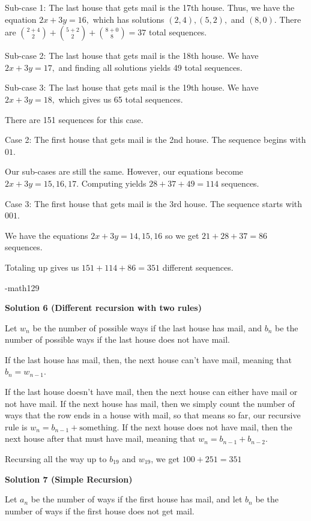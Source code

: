 \begin{enumerate}
 Sub-case 1: The last house that gets mail is the 17th house. Thus, we have the equation $2x+3y=16,$ which has solutions $(2,4),(5,2),$ and $(8,0).$ There are $\binom{2+4}{2}+\binom{5+2}{2}+\binom{8+0}{8}=37$ total sequences.

 Sub-case 2: The last house that gets mail is the 18th house. We have $2x+3y=17,$ and finding all solutions yields 49 total sequences.

 Sub-case 3: The last house that gets mail is the 19th house. We have $2x+3y=18,$ which gives us 65 total sequences.

 There are 151 sequences for this case.

 Case 2: The first house that gets mail is the 2nd house. The sequence begins with $01.$

 Our sub-cases are still the same. However, our equations become $2x+3y=15,16,17.$ Computing yields $28+37+49=114$ sequences.

 Case 3: The first house that gets mail is the 3rd house. The sequence starts with $001.$

 We have the equations $2x+3y=14,15,16$ so we get $21+28+37=86$ sequences.

 Totaling up gives us $151+114+86=351$ different sequences.

 -math129

 



\textbf{Solution 6 (Different recursion with two rules)}

Let $w_n$ be the number of possible ways if the last house has mail, and $b_n$ be the number of possible ways if the last house does not have mail.

 If the last house has mail, then, the next house can't have mail, meaning that $b_n = w_{n - 1}$. 

 If the last house doesn't have mail, then the next house can either have mail or not have mail. If the next house has mail, then we simply count the number of ways that the row ends in a house with mail, so that means so far, our recursive rule is $w_n = b_{n - 1} + \text{something}$. If the next house does not have mail, then the next house after that must have mail, meaning that $w_n = b_{n - 1} + b_{n - 2}$. 

 Recursing all the way up to $b_{19}$ and $w_{19}$, we get $100 + 251 = \boxed{351}$




\textbf{Solution 7 (Simple Recursion)}

Let $a_n$ be the number of ways if the first house has mail, and let $b_n$ be the number of ways if the first house does not get mail.


\end{enumerate}
